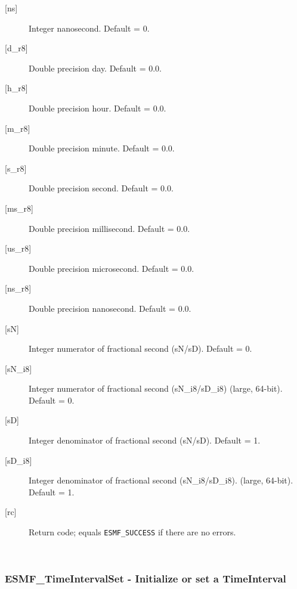 \begin{description}
       \item[{[ns]}]
            Integer nanosecond.  Default = 0.
       \item[{[d\_r8]}]
            Double precision day.  Default = 0.0.
       \item[{[h\_r8]}]
            Double precision hour.  Default = 0.0.
       \item[{[m\_r8]}]
            Double precision minute.  Default = 0.0.
       \item[{[s\_r8]}]
            Double precision second.  Default = 0.0.
       \item[{[ms\_r8]}]
            Double precision millisecond.  Default = 0.0.
       \item[{[us\_r8]}]
            Double precision microsecond.  Default = 0.0.
       \item[{[ns\_r8]}]
            Double precision nanosecond.  Default = 0.0.
       \item[{[sN]}]
            Integer numerator of fractional second (sN/sD).
            Default = 0.
       \item[{[sN\_i8]}]
            Integer numerator of fractional second (sN\_i8/sD\_i8)
                                                             (large, 64-bit).
            Default = 0.
       \item[{[sD]}]
            Integer denominator of fractional second (sN/sD).
            Default = 1.
       \item[{[sD\_i8]}]
            Integer denominator of fractional second (sN\_i8/sD\_i8).
                                                             (large, 64-bit).
            Default = 1.
       \item[{[rc]}]
            Return code; equals {\tt ESMF\_SUCCESS} if there are no errors.
       \end{description}
   
 
\mbox{}\hrulefill\ 
 
\subsubsection [ESMF\_TimeIntervalSet] {ESMF\_TimeIntervalSet - Initialize or set a TimeInterval}


